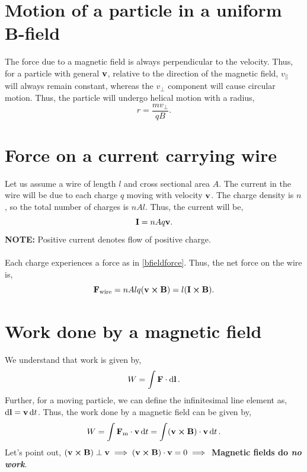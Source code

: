 \documentclass{book}
\begin{document}
\section{Motion of a particle in a uniform B-field}
The force due to a magnetic field is always perpendicular to the velocity. Thus, for a particle with general $\vb{v}$, relative to the direction of the magnetic field, $v_{||}$ will always remain constant, whereas the $v_{\perp}$ component will cause circular motion. Thus, the particle will undergo helical motion with a radius,
\begin{equation}
    r = \frac{mv_{\perp}}{qB}.
\end{equation}

\section{Force on a current carrying wire}
Let us assume a wire of length $l$ and cross sectional area $A$. The current in the wire will be due to each charge $q$ moving with velocity $\vb{v}$. The charge density is $n$, so the total number of charges is $nAl$. Thus, the current will be,
\begin{equation}
    \vb{I} = nAq\vb{v}.
\end{equation}
\textbf{NOTE:} Positive current denotes flow of positive charge.
\\\\
Each charge experiences a force as in \eqref{bfieldforce}. Thus, the net force on the wire is,
\begin{equation}
    \vb{F}_{\text{wire}} = nAlq(\vb{v}\cross\vb{B}) = l (\vb{I}\cross \vb{B}). \label{forceonwire}
\end{equation}
\section{Work done by a magnetic field}
We understand that work is given by,
\begin{equation*}
    W = \int \vb{F}\cdot \dd{\vb{l}}.
\end{equation*}
Further, for a moving particle, we can define the infinitesimal line element as, $\dd{\vb{l}} = \vb{v}\dd{t}$. Thus, the work done by a magnetic field can be given by,
\begin{equation}
    W = \int \vb{F}_{\text{m}} \cdot \vb{v}\dd{t} = \int (\vb{v}\cross\vb{B})\cdot\vb{v}\dd{t}.
\end{equation}
Let's point out, $(\vb{v}\cross \vb{B}) \perp \vb{v} \implies (\vb{v}\cross\vb{B})\cdot\vb{v} = 0 \implies$ \textbf{Magnetic fields do \textit{no work}}.
\end{document}
